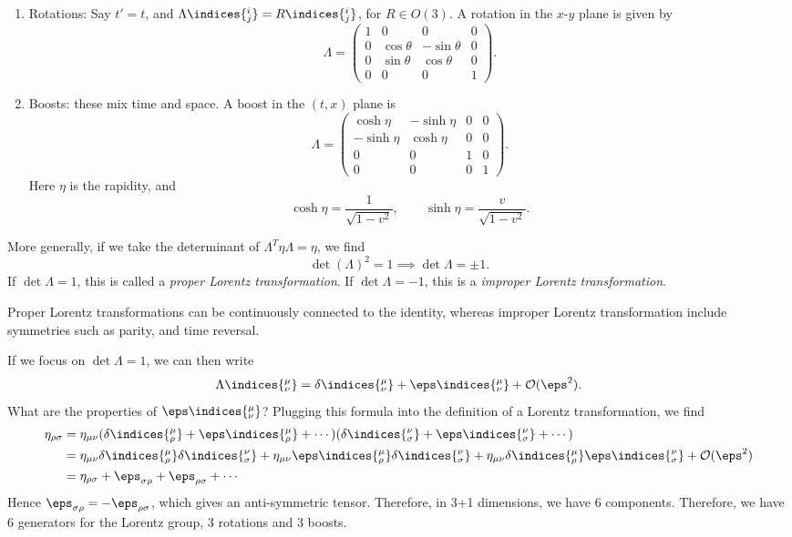 \documentclass[12pt]{article}
\begin{document}
\begin{exbox}
	\begin{enumerate}
		\item Rotations: Say $t' = t$, and $\Lambda\indices{^{i}_{j}} = R\indices{^{i}_{j}}$, for $R \in O(3)$. A rotation in the $x$-$y$ plane is given by
		\[
		\Lambda =
		\begin{pmatrix}
			1 & 0 & 0 & 0 \\
			0 & \cos \theta & - \sin \theta & 0 \\
			0 & \sin \theta & \cos \theta & 0 \\
			0 & 0 & 0 & 1
		\end{pmatrix}.
		\]
	\item Boosts: these mix time and space. A boost in the $(t, x)$ plane is
		\[
		\Lambda =
		\begin{pmatrix}
			\cosh \eta & - \sinh \eta & 0 & 0 \\
			- \sinh \eta & \cosh \eta & 0 & 0 \\
			0 & 0 & 1 & 0 \\
			0 & 0 & 0 & 1
		\end{pmatrix}.
		\]
		Here $\eta$ is the rapidity, and
		\[
			\cosh \eta = \frac{1}{\sqrt{1 - v^2}}, \qquad \sinh \eta = \frac{v}{\sqrt{1 - v^2}}.
		\]
	\end{enumerate}
\end{exbox}

More generally, if we take the determinant of $\Lambda^T \eta \Lambda = \eta$, we find
\[
\det (\Lambda)^2 = 1 \implies \det \Lambda = \pm 1.
\]
If $\det \Lambda = 1$, this is called a \emph{proper Lorentz transformation}. If $\det \Lambda = -1$, this is a \emph{improper Lorentz transformation}.

Proper Lorentz transformations can be continuously connected to the identity, whereas improper Lorentz transformation include symmetries such as parity, and time reversal.

If we focus on $\det \Lambda = 1$, we can then write
\[
\Lambda\indices{^{\mu}_{\nu}} = \delta\indices{^{\mu}_{\nu}} + \eps\indices{^{\mu}_{\nu}} + \mathcal{O}(\eps^2).
\]
What are the properties of $\eps\indices{^{\mu}_{\nu}}$? Plugging this formula into the definition of a Lorentz transformation, we find
\begin{align*}
	\eta_{\rho\sigma} &= \eta_{\mu\nu} (\delta\indices{^{\mu}_{\rho}} + \eps\indices{^{\mu}_{\rho}} + \cdots)(\delta\indices{^{\nu}_{\sigma}} + \eps\indices{^{\nu}_{\sigma}} + \cdots) \\
			  &= \eta_{\mu\nu} \delta\indices{^{\mu}_{\rho}} \delta\indices{^{\nu}_{\sigma}} + \eta_{\mu\nu} \eps\indices{^{\mu}_{\rho}} \delta\indices{^{\nu}_{\sigma}} + \eta_{\mu\nu} \delta\indices{^{\mu}_{\rho}} \eps\indices{^{\nu}_{\sigma}} + \mathcal{O}(\eps^2) \\
			  &= \eta_{\rho\sigma} + \eps_{\sigma\rho} + \eps_{\rho\sigma} + \cdots
\end{align*}
Hence $\eps_{\sigma\rho} = - \eps_{\rho\sigma}$, which gives an anti-symmetric tensor. Therefore, in 3+1 dimensions, we have 6 components. Therefore, we have 6 generators for the Lorentz group, 3 rotations and 3 boosts.
\end{document}
